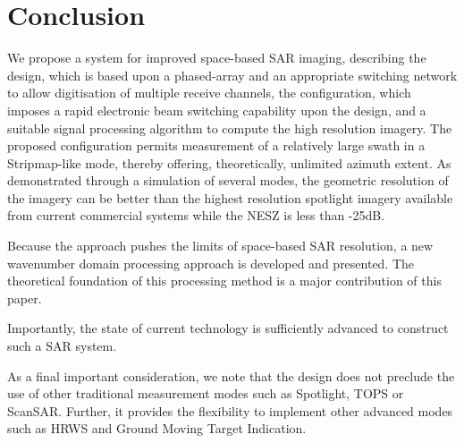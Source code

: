 \section{Conclusion}
We propose a system for improved space-based SAR imaging, describing the design, which is based upon a phased-array and an appropriate switching network to allow digitisation of multiple receive channels, the configuration, which imposes a rapid electronic beam switching capability upon the design, and a suitable signal processing algorithm to compute the high resolution imagery. The proposed configuration permits measurement of a relatively large swath in a Stripmap-like mode, thereby offering, theoretically, unlimited azimuth extent. As demonstrated through a simulation of several modes, the geometric resolution of the imagery can be better than the highest resolution spotlight imagery available from current commercial systems while the NESZ is less than -25dB.
\par
Because the approach pushes the limits of space-based SAR resolution, a new wavenumber domain processing approach is developed and presented. The theoretical foundation of this processing method is a major contribution of this paper.   
\par
Importantly, the state of current technology is sufficiently advanced to construct such a SAR system.
\par
As a final important consideration, we note that the design does not preclude the use of other traditional measurement modes such as Spotlight, TOPS or ScanSAR. Further, it provides the flexibility to implement other advanced modes such as HRWS and Ground Moving Target Indication.
